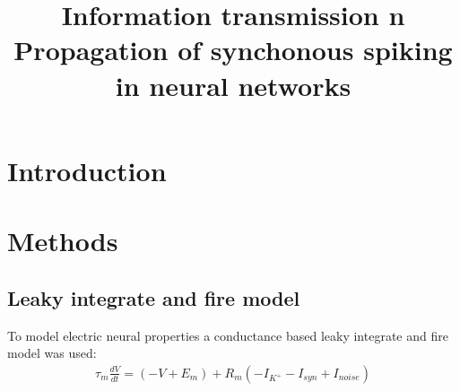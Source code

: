 \documentclass[12pt,a4paper, bibliography=totoc, listof=numbered, footexclude, BCOR=8.25mm, twoside]{scrartcl}
\begin{document}
 \title{Information transmission n                   }
 \title{Propagation of synchonous spiking in neural networks}
 \section{Introduction}
 \section{Methods}
 \subsection{Leaky integrate and fire model}
 To model electric neural properties a conductance based leaky integrate and fire model was used:
 \begin{align}
 \tau_m\frac{dV}{dt}= (-V + E_m) + R_m (- I_{K^+} - I_{syn} + I_{noise})
 \end{align}
 
\end{document}
